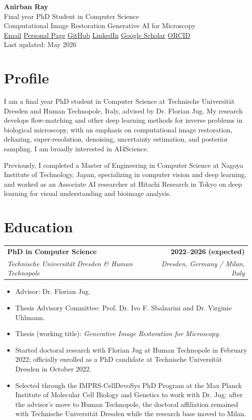 \documentclass[11pt,a4paper]{article}
\makeatletter
\newcommand{\entry}[4]{%
  \begin{tabularx}{\linewidth}{@{}>{\raggedright\arraybackslash}X r@{}}
    \textbf{#1} & \textbf{#2} \\
    \textit{#3} & \textit{#4}
  \end{tabularx}\vspace{-2pt}
}
\makeatother
\begin{document}
\begin{center}
  {\LARGE \textbf{Anirban Ray}}\\
  Final year PhD Student in Computer Science \\ Computational Image Restoration \textbar{} Generative AI for Microscopy\\
  \href{mailto:anirban.ray@fht.org}{Email}
  \textbar{} \href{https://rayanirban.github.io/}{Personal Page}
  \textbar{} \href{https://github.com/rayanirban}{GitHub}
  \textbar{} \href{https://www.linkedin.com/in/anirban-ray/}{LinkedIn}
  \textbar{} \href{https://scholar.google.de/citations?user=t-f_mwsAAAAJ}{Google Scholar}
  \textbar{} \href{https://orcid.org/0000-0002-7285-6727}{ORCID}\\
  Last updated: May 2026
\end{center}

\section*{Profile}
I am a final year PhD student in Computer Science at Technische Universit\"at Dresden and Human Technopole, Italy, advised by Dr. Florian Jug. My research develops flow-matching and other deep learning methods for inverse problems in biological microscopy, with an emphasis on computational image restoration, dehazing, super-resolution, denoising, uncertainty estimation, and posterior sampling. I am broadly interested in AI4Science.

Previously, I completed a Master of Engineering in Computer Science at Nagoya Institute of Technology, Japan, specializing in computer vision and deep learning, and worked as an Associate AI researcher at Hitachi Research in Tokyo on deep learning for visual understanding and bioimage analysis.

\section*{Education}
\entry{PhD in Computer Science}{2022--2026 (expected)}{Technische Universit\"at Dresden \& Human Technopole}{Dresden, Germany / Milan, Italy}
\begin{itemize}
  \item Advisor: Dr. Florian Jug.
  \item Thesis Advisory Committee: Prof. Dr. Ivo F. Sbalzarini and Dr. Virginie Uhlmann.
  \item Thesis (working title): \textit{Generative Image Restoration for Microscopy}.
  \item Started doctoral research with Florian Jug at Human Technopole in February 2022; officially enrolled as a PhD candidate at Technische Universit\"at Dresden in October 2022.
  \item Selected through the IMPRS-CellDevoSys PhD Program at the Max Planck Institute of Molecular Cell Biology and Genetics to work with Dr. Jug; after the advisor's move to Human Technopole, the doctoral affiliation remained with Technische Universit\"at Dresden while the research base moved to Milan.
\end{itemize}
\end{document}
